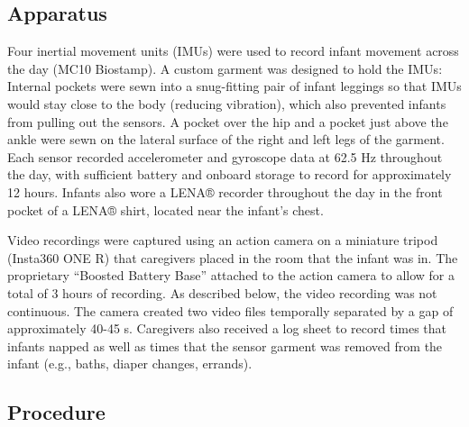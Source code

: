 \documentclass[
  man]{apa6}
\begin{document}
\hypertarget{apparatus}{%
\subsection{Apparatus}\label{apparatus}}

Four inertial movement units (IMUs) were used to record infant movement across the day (MC10 Biostamp). A custom garment was designed to hold the IMUs: Internal pockets were sewn into a snug-fitting pair of infant leggings so that IMUs would stay close to the body (reducing vibration), which also prevented infants from pulling out the sensors. A pocket over the hip and a pocket just above the ankle were sewn on the lateral surface of the right and left legs of the garment. Each sensor recorded accelerometer and gyroscope data at 62.5 Hz throughout the day, with sufficient battery and onboard storage to record for approximately 12 hours. Infants also wore a LENA® recorder throughout the day in the front pocket of a LENA® shirt, located near the infant's chest.

Video recordings were captured using an action camera on a miniature tripod (Insta360 ONE R) that caregivers placed in the room that the infant was in. The proprietary ``Boosted Battery Base'' attached to the action camera to allow for a total of 3 hours of recording. As described below, the video recording was not continuous. The camera created two video files temporally separated by a gap of approximately 40-45 s. Caregivers also received a log sheet to record times that infants napped as well as times that the sensor garment was removed from the infant (e.g., baths, diaper changes, errands).

\hypertarget{procedure}{%
\subsection{Procedure}\label{procedure}}
\end{document}

